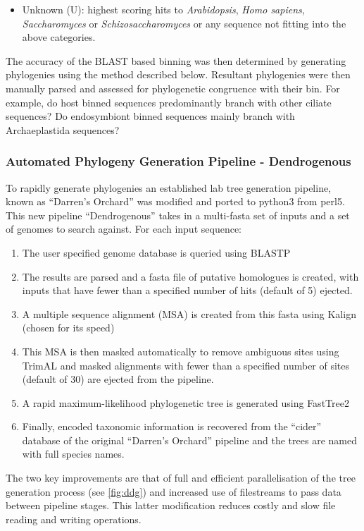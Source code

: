 \begin{itemize}
\item Unknown (U): highest scoring hits to \textit{Arabidopsis}, \textit{Homo sapiens}, \textit{Saccharomyces} or \textit{Schizosaccharomyces} 
    or any sequence not fitting into the above categories.
\end{itemize}

The accuracy of the BLAST based binning was then determined by generating phylogenies
using the method described below. Resultant phylogenies were then manually
parsed and assessed for phylogenetic congruence with their bin.
For example, do host binned sequences predominantly branch with other ciliate sequences?
Do endosymbiont binned sequences mainly branch with Archaeplastida sequences?

\subsubsection{Automated Phylogeny Generation Pipeline - Dendrogenous}

To rapidly generate phylogenies an established lab tree generation pipeline, known as ``Darren's Orchard'' 
\citep{Richards2009g} was modified and ported to python3 from perl5.  This new pipeline ``Dendrogenous'' 
takes in a multi-fasta set of inputs and a set of genomes to search against.
For each input sequence:
\begin{enumerate} 
    \item The user specified genome database is queried using BLASTP
    \item The results are parsed and a fasta file of putative homologues is created, with inputs that have fewer than a specified 
        number of hits (default of 5) ejected.
    \item A multiple sequence alignment (MSA) is created from this fasta using Kalign (chosen for its speed) \citep{Lassmann2009}
    \item This MSA is then masked automatically to remove ambiguous sites using TrimAL \citep{Capella-Gutierrez2009} and masked alignments
        with fewer than a specified number of sites (default of 30) are ejected from the pipeline.
    \item A rapid maximum-likelihood phylogenetic tree is generated using FastTree2 \citep{Price2010}
    \item Finally, encoded taxonomic information is recovered from the ``cider'' database of the original ``Darren's Orchard'' pipeline 
        and the trees are named with full species names.
\end{enumerate}
The two key improvements are that of full and efficient parallelisation of the tree generation process (see \cref{fig:ddg})
and increased use of filestreams to pass data between pipeline stages.  This latter modification reduces costly and slow
file reading and writing operations.

